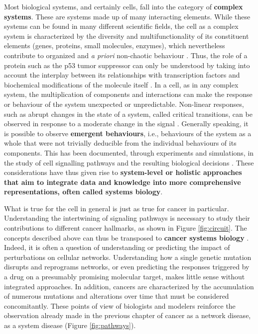 \documentclass[a4paper,12pt,twoside,onecolumn,openright,final,oldfontcommands]{memoir}
\begin{document}
Most biological systems, and certainly cells, fall into the category of
\textbf{complex systems}. These are systems made up of many interacting
elements. While these systems can be found in many different scientific
fields, the cell as a complex system is characterized by the diversity
and multifunctionality of its constituent elements (genes, proteins,
small molecules, enzymes), which nevertheless contribute to organized
and \emph{a priori} non-chaotic behaviour
\citep{kitano2002computational}. Thus, the role of a protein such as the
p53 tumor suppressor can only be understood by taking into account the
interplay between its relationships with transcription factors and
biochemical modifications of the molecule itself
\citep{kitano2002computational}. In a cell, as in any complex system,
the multiplication of components and interactions can make the response
or behaviour of the system unexpected or unpredictable. Non-linear
responses, such as abrupt changes in the state of a system, called
critical transitions, can be observed in response to a moderate change
in the signal \citep{trefois2015critical}. Generally speaking, it is
possible to observe \textbf{emergent behaviours}, i.e., behaviours of
the system as a whole that were not trivially deducible from the
individual behaviours of its components. This has been documented,
through experiments and simulations, in the study of cell signalling
pathways and the resulting biological decisions
\citep{bhalla1999emergent, helikar2008emergent}. These considerations
have thus given rise to \textbf{system-level or holistic approaches that
aim to integrate data and knowledge into more comprehensive
representations, often called systems biology}.

What is true for the cell in general is just as true for cancer in
particular. Understanding the intertwining of signaling pathways is
necessary to study their contributions to different cancer hallmarks, as
shown in Figure \ref{fig:circuit}. The concepts described above can thus
be transposed to \textbf{cancer systems biology}
\citep{hornberg2006cancer, kreeger2010cancer, barillot2012computational}.
Indeed, it is often a question of understanding or predicting the impact
of perturbations on cellular networks. Understanding how a single
genetic mutation disrupts and reprograms networks, or even predicting
the responses triggered by a drug on a presumably promising molecular
target, makes little sense without integrated approaches. In addition,
cancers are characterized by the accumulation of numerous mutations and
alterations over time that must be considered concomitantly. These
points of view of biologists and modelers reinforce the observation
already made in the previous chapter of cancer as a network disease, as
a system disease (Figure \ref{fig:pathways}).
\end{document}
